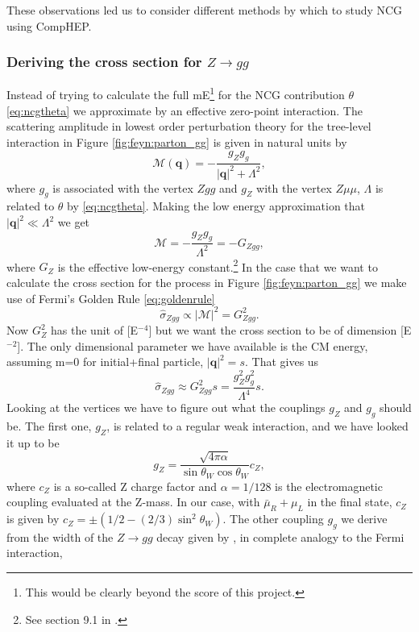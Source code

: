 These observations led us to consider different methods by which to study NCG using CompHEP.

\subsubsection{Deriving the cross section for $Z \rightarrow gg$}
Instead of trying to calculate the full mE\footnote{This would be clearly beyond the score of this project.} for the NCG contribution $\theta$ \eqref{eq:ncgtheta} we approximate by an effective zero-point interaction. The scattering amplitude in lowest order perturbation theory for the tree-level interaction in Figure \ref{fig:feyn:parton_gg} is given in natural units by
\begin{equation}
	\mathcal{M}(\mathbf{q}) = -\frac{g_Z g_g }{|\mathbf{q}|^2 + \Lambda^2},
\end{equation}
where $g_g$ is associated with the vertex $Zgg$ and $g_Z$ with the vertex $Z\mu\mu$, $\Lambda$ is related to $\theta$ by \eqref{eq:ncgtheta}. Making the low energy approximation that $|\mathbf{q}|^2 \ll \Lambda^2$ we get
\begin{equation} \label{eq:scatteringamplitude}
	\mathcal{M} = -\frac{g_Z g_g}{\Lambda^2} = -G_{Zgg},
\end{equation}
where $G_Z$ is the effective low-energy constant.\footnote{See section 9.1 in \cite{martin1998pp}.} In the case that we want to calculate the cross section for the process in Figure \ref{fig:feyn:parton_gg} we make use of Fermi's Golden Rule \eqref{eq:goldenrule}
\begin{equation}
	\hat \sigma_{Zgg} \propto |\mathcal{M}|^2 = G_{Zgg}^2.
\end{equation}
Now $G_Z^2$ has the unit of [E$^{-4}$] but we want the cross section to be of dimension [E$^{-2}$]. The only dimensional parameter we have available is the CM energy, assuming m=0 for initial+final particle, $|\mathbf{q}|^2 = s$. That gives us
\begin{equation}
	\hat \sigma_{Zgg} \approx G_{Zgg}^2 s = \frac{g_Z^2 g_g^2}{\Lambda^4}s.
\end{equation}
Looking at the vertices we have to figure out what the couplings $g_Z$ and $g_g$ should be. The first one, $g_Z$, is related to a regular weak interaction, and we have looked it up to be \cite{bettini2008iep}
\begin{equation}
	g_Z = \frac{\sqrt{4\pi\alpha}}{\sin{\theta_W}\cos{\theta_W}} c_Z,
\end{equation}
where $c_Z$ is a so-called Z charge factor and $\alpha = 1/128$ is the electromagnetic coupling evaluated at the Z-mass. In our case, with $\bar \mu_R + \mu_L$ in the final state, $c_Z$ is given by $c_Z = \pm (1/2 - (2/3)\sin^2{\theta_W})$. The other coupling $g_g$ we derive from the width of the $Z \rightarrow gg$ decay given by \cite{behr2003dnc}, in complete analogy to the Fermi interaction,
